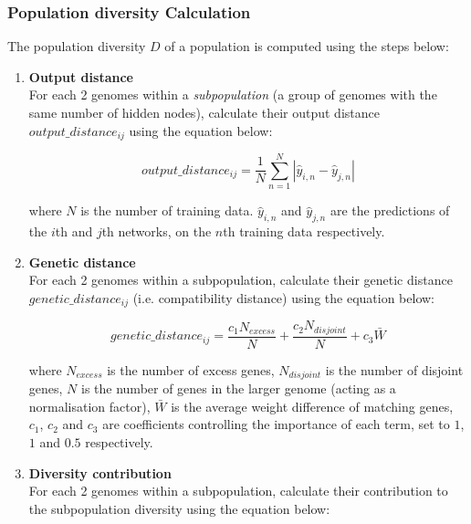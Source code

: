 \subsubsection{Population diversity Calculation}
\label{subsubsec:neat_ncl_population_diversity}
The population diversity $D$ of a population is computed using the steps below: 
\begin{enumerate}
    \item \textbf{Output distance} \\
    For each 2 genomes within a \textit{subpopulation} (a group of genomes with the same number of hidden nodes), calculate their output distance $output\_distance_{ij}$ using the equation below: 

    \begin{equation}
        \label{equation:neat_ncl_output_distance}
        output\_distance_{ij} = \frac{1}{N} \sum_{n = 1}^N \left| \hat{y}_{i,n} - \hat{y}_{j,n} \right|
    \end{equation}

    where $N$ is the number of training data. $\hat{y}_{i,n}$ and $\hat{y}_{j,n}$ are the predictions of the $i$th and $j$th networks, on the $n$th training data respectively. 

    \item \textbf{Genetic distance} \\
    For each 2 genomes within a subpopulation, calculate their genetic distance $genetic\_distance_{ij}$ (i.e. compatibility distance) using the equation below: 

    \begin{equation}
        \label{equation:neat_ncl_genetic_distance}
        genetic\_distance_{ij} = \frac{c_1 N_{excess}}{N} + \frac{c_2 N_{disjoint}}{N} + c_3 \bar{W}
    \end{equation}

    where $N_{excess}$ is the number of excess genes, $N_{disjoint}$ is the number of disjoint genes, $N$ is the number of genes in the larger genome (acting as a normalisation factor), $\bar{W}$ is the average weight difference of matching genes, $c_1$, $c_2$ and $c_3$ are coefficients controlling the importance of each term, set to $1$, $1$ and $0.5$ respectively. 

    \item \textbf{Diversity contribution} \\
    For each 2 genomes within a subpopulation, calculate their contribution to the subpopulation diversity using the equation below: 


\end{enumerate}
